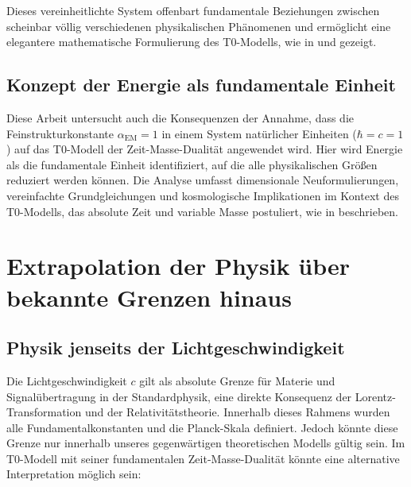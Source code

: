 \documentclass[12pt,a4paper]{article}
\newcommand{\alphaEM}{\alpha_{\text{EM}}}
\begin{document}
	Dieses vereinheitlichte System offenbart fundamentale Beziehungen zwischen scheinbar völlig verschiedenen physikalischen Phänomenen und ermöglicht eine elegantere mathematische Formulierung des T0-Modells, wie in \cite{pascher_lagrange_2025} und \cite{pascher_alphabeta_2025} gezeigt.
	
	\subsection{Konzept der Energie als fundamentale Einheit}
	\label{subsec:energy_concept}
	
	Diese Arbeit untersucht auch die Konsequenzen der Annahme, dass die Feinstrukturkonstante \(\alphaEM = 1\) in einem System natürlicher Einheiten (\(\hbar = c = 1\)) auf das T0-Modell der Zeit-Masse-Dualität angewendet wird. Hier wird Energie als die fundamentale Einheit identifiziert, auf die alle physikalischen Größen reduziert werden können. Die Analyse umfasst dimensionale Neuformulierungen, vereinfachte Grundgleichungen und kosmologische Implikationen im Kontext des T0-Modells, das absolute Zeit und variable Masse postuliert, wie in \cite{pascher_zeit_masse_2025} beschrieben.
	
	\section{Extrapolation der Physik über bekannte Grenzen hinaus}
	\label{sec:beyond_limits}
	
	\subsection{Physik jenseits der Lichtgeschwindigkeit}
	\label{subsec:beyond_lightspeed}
	
	Die Lichtgeschwindigkeit \(c\) gilt als absolute Grenze für Materie und Signalübertragung in der Standardphysik, eine direkte Konsequenz der Lorentz-Transformation und der Relativitätstheorie. Innerhalb dieses Rahmens wurden alle Fundamentalkonstanten und die Planck-Skala definiert. Jedoch könnte diese Grenze nur innerhalb unseres gegenwärtigen theoretischen Modells gültig sein. Im T0-Modell mit seiner fundamentalen Zeit-Masse-Dualität könnte eine alternative Interpretation möglich sein:
	
\end{document}

